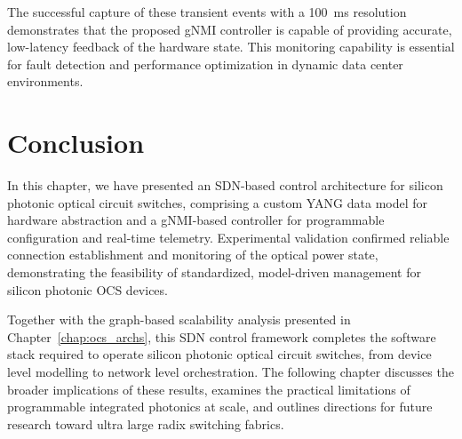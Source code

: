 The successful capture of these transient events with a 100~ms resolution demonstrates that the proposed gNMI controller is capable of providing accurate, low-latency feedback of the hardware state.
This monitoring capability is essential for fault detection and performance optimization in dynamic data center environments.

\section{Conclusion}\label{sec:ch5_conclusion} %
In this chapter, we have presented an SDN-based control architecture for silicon photonic optical circuit switches, comprising a custom YANG data model for hardware abstraction and a gNMI-based controller for programmable configuration and real-time telemetry.
Experimental validation confirmed reliable connection establishment and monitoring of the optical power state, demonstrating the feasibility of standardized, model-driven management for silicon photonic OCS devices.

Together with the graph-based scalability analysis presented in Chapter~\ref{chap:ocs_archs}, this SDN control framework completes the software stack required to operate silicon photonic optical circuit switches, from device level modelling to network level orchestration.
The following chapter discusses the broader implications of these results, examines the practical limitations of programmable integrated photonics at scale, and outlines directions for future research toward ultra large radix switching fabrics.